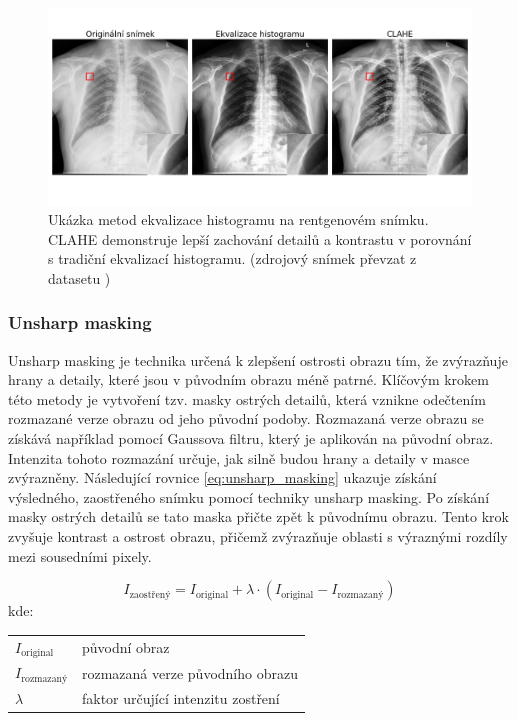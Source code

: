\documentclass[male,czech,api_ing]{thesis}
\makeatletter
\newenvironment{conditions}[1][kde:]
    {#1 \begin{tabular}[t]{>{$}l<{$} @{${}={}$} >{\raggedright\arraybackslash}p{10cm}}}
    {\end{tabular}}
\makeatother
\begin{document}
\begin{figure}[ht]
    \centering
    \includegraphics[width=\linewidth]{Prilohy/Obrazky/ImageEnhancement.png}
    \caption{Ukázka metod ekvalizace histogramu na rentgenovém snímku. CLAHE demonstruje lepší zachování detailů a kontrastu v porovnání s tradiční ekvalizací histogramu. (zdrojový snímek převzat z datasetu \cite{LungDataset})}
    \label{fig:histogram_equalization}
\end{figure}

\subsubsection{Unsharp masking}
Unsharp masking je technika určená k zlepšení ostrosti obrazu tím, že zvýrazňuje hrany a detaily, které jsou v původním obrazu méně patrné. Klíčovým krokem této metody je vytvoření tzv. masky ostrých detailů, která vznikne odečtením rozmazané verze obrazu od jeho původní podoby. Rozmazaná verze obrazu se získává například pomocí Gaussova filtru, který je aplikován na původní obraz. Intenzita tohoto rozmazání určuje, jak silně budou hrany a detaily v masce zvýrazněny. Následující rovnice \ref{eq:unsharp_masking} ukazuje získání výsledného, zaostřeného snímku pomocí techniky unsharp masking. Po získání masky ostrých detailů se tato maska přičte zpět k původnímu obrazu. Tento krok zvyšuje kontrast a ostrost obrazu, přičemž zvýrazňuje oblasti s výraznými rozdíly mezi sousedními pixely. \cite{UnsharpMasking}

\begin{equation}
    I_{\text{zaostřený}} = I_{\text{original}} + \lambda \cdot (I_{\text{original}} - I_{\text{rozmazaný}})
    \label{eq:unsharp_masking}
\end{equation}
\begin{conditions}
    I_{\text{original}} & původní obraz \\
    I_{\text{rozmazaný}} & rozmazaná verze původního obrazu \\
    \lambda & faktor určující intenzitu zostření
\end{conditions}
\end{document}
